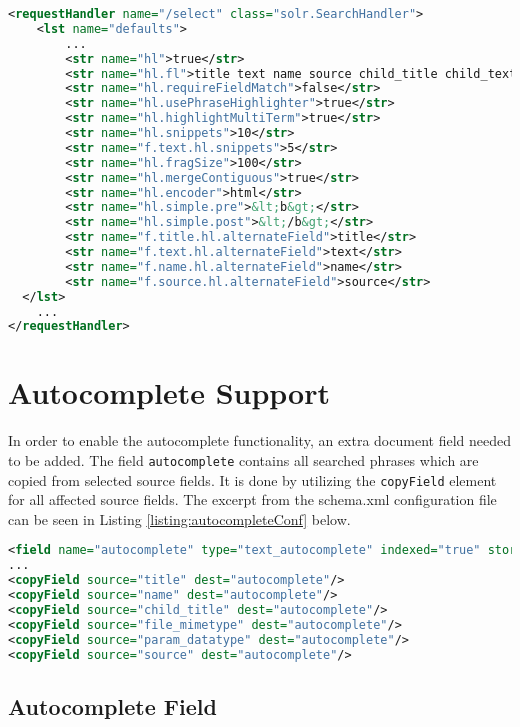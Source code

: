\begin{lstlisting}[language=XML, caption={Highlighting configuration.}, label={listing:highlightConf}]
<requestHandler name="/select" class="solr.SearchHandler">
	<lst name="defaults">
		...
		<str name="hl">true</str>
		<str name="hl.fl">title text name source child_title child_text child_param_datatype</str>
		<str name="hl.requireFieldMatch">false</str>
		<str name="hl.usePhraseHighlighter">true</str>
		<str name="hl.highlightMultiTerm">true</str>
		<str name="hl.snippets">10</str>
		<str name="f.text.hl.snippets">5</str>
		<str name="hl.fragSize">100</str>
		<str name="hl.mergeContiguous">true</str>
		<str name="hl.encoder">html</str>
		<str name="hl.simple.pre">&lt;b&gt;</str>
		<str name="hl.simple.post">&lt;/b&gt;</str>
		<str name="f.title.hl.alternateField">title</str>
		<str name="f.text.hl.alternateField">text</str>
		<str name="f.name.hl.alternateField">name</str>
		<str name="f.source.hl.alternateField">source</str>
  </lst>
	...
</requestHandler>
\end{lstlisting}

\section{Autocomplete Support}

In order to enable the autocomplete functionality, an extra document field needed to be added.
The field \texttt{autocomplete} contains all searched phrases which are copied from selected source fields. It is done by utilizing the \texttt{copyField} element for all affected source fields. The excerpt from the schema.xml configuration file can be seen in  Listing \ref{listing:autocompleteConf} below.

\begin{lstlisting}[language=XML, caption={Configuration of Autocomplete.}, label={listing:autocompleteConf}]
<field name="autocomplete" type="text_autocomplete" indexed="true" stored="true" multiValued="true" />
...
<copyField source="title" dest="autocomplete"/>
<copyField source="name" dest="autocomplete"/>
<copyField source="child_title" dest="autocomplete"/>
<copyField source="file_mimetype" dest="autocomplete"/>
<copyField source="param_datatype" dest="autocomplete"/>
<copyField source="source" dest="autocomplete"/>
\end{lstlisting}

\subsection{Autocomplete Field}

